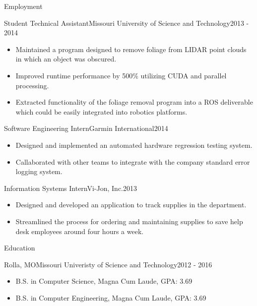 \documentclass[]{mcdowellcv}
\begin{document}
\begin{cvsection}{Employment}
        \begin{cvsubsection}[2]{Student Technical Assistant}{Missouri University of Science and Technology}{2013 - 2014}        
            \begin{itemize}
                \item Maintained a program designed to remove foliage from LIDAR point clouds in which an object was obscured.
                \item Improved runtime performance by 500\% utilizing CUDA and parallel processing.
                \item Extracted functionality of the foliage removal program into a ROS deliverable which could be easily integrated into robotics platforms.
            \end{itemize}
        \end{cvsubsection}
        
        \begin{cvsubsection}{Software Engineering Intern}{Garmin International}{2014}   
            \begin{itemize}
                \item Designed and implemented an automated hardware regression testing system.
                \item Callaborated with other teams to integrate with the company standard error logging system.
            \end{itemize}
        \end{cvsubsection}

\begin{vijon}
        \begin{cvsubsection}{Information Systems Intern}{Vi-Jon, Inc.}{2013}
            \begin{itemize}
                \item Designed and developed an application to track supplies in the department.
                \item Streamlined the process for ordering and maintaining supplies to save help desk employees around four hours a week.
            \end{itemize}
        \end{cvsubsection}
\end{vijon}

    \end{cvsection}
    
    \begin{cvsection}{Education}
        \begin{cvsubsection}[2]{Rolla, MO}{Missouri Univeristy of Science and Technology}{2012 - 2016}
            \begin{itemize}
                \item B.S. in Computer Science, Magna Cum Laude, GPA: 3.69
                \item B.S. in Computer Engineering, Magna Cum Laude, GPA: 3.69
            \end{itemize}
        \end{cvsubsection}
    \end{cvsection} 
    
\end{document}
